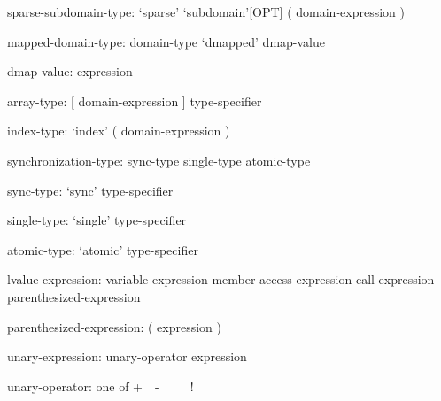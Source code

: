 \begin{syntax}
sparse-subdomain-type:
  `sparse' `subdomain'[OPT] ( domain-expression )
\end{syntax}

\begin{syntax}
mapped-domain-type:
  domain-type `dmapped' dmap-value
\end{syntax}

\begin{syntax}
dmap-value:
  expression
\end{syntax}

\begin{syntax}
array-type:
  [ domain-expression ] type-specifier
\end{syntax}

\begin{syntax}
index-type:
  `index' ( domain-expression )
\end{syntax}

\begin{syntax}
synchronization-type:
  sync-type
  single-type
  atomic-type
\end{syntax}

\begin{syntax}
sync-type:
  `sync' type-specifier
\end{syntax}

\begin{syntax}
single-type:
  `single' type-specifier
\end{syntax}

\begin{syntax}
atomic-type:
  `atomic' type-specifier
\end{syntax}

\begin{syntax}
lvalue-expression:
  variable-expression
  member-access-expression
  call-expression
  parenthesized-expression
\end{syntax}

\begin{syntax}
parenthesized-expression:
  ( expression )
\end{syntax}

\begin{syntax}
unary-expression:
  unary-operator expression
\end{syntax}

\begin{syntax}
unary-operator: one of
  + $ $ $ $ - $ $ $ $ ~ $ $ $ $ !
\end{syntax}

